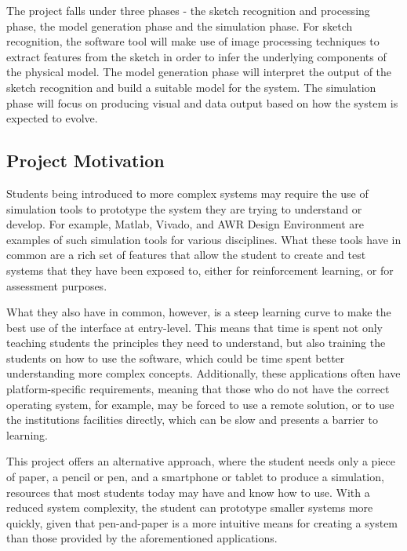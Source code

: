 \documentclass{article}
\begin{document}
The project falls under three phases - the sketch recognition and processing phase, the 
model generation phase and the simulation phase. For sketch recognition, the software tool
will make use of image processing techniques to extract features from the sketch in order to 
infer the underlying components of the physical model. The model generation phase will 
interpret the output of the sketch recognition and build a suitable model for the system.
The simulation phase will focus on producing visual and data output based on how the system
is expected to evolve.

\subsection{Project Motivation}
\label{subsec:Project Motivation}


Students being introduced to more complex systems may require the use of simulation
tools to prototype the system they are trying to understand or develop. For example, Matlab,
Vivado, and AWR Design Environment are examples of such simulation tools for various 
disciplines. What these tools have in common are a rich set of features that allow the student
to create and test systems that they have been exposed to, either for reinforcement learning,
or for assessment purposes. 

What they also have in common, however, is a steep learning curve to make the best use 
of the interface at entry-level. This means that time is spent not only teaching students the 
principles they need to understand, but also training the students on how to use the software, 
which could be time spent better understanding more complex concepts. Additionally, these 
applications often have platform-specific requirements, meaning that those who do not have 
the correct operating system, for example, may be forced to use a remote solution, or to 
use the institutions facilities directly, which can be slow and presents a barrier to learning.

This project offers an alternative approach, where the student needs only a piece of paper,
a pencil or pen, and a smartphone or tablet to produce a simulation, resources that most
students today may have and know how to use. With a reduced system complexity, the student can 
prototype smaller systems more quickly, given that pen-and-paper is a more intuitive means for 
creating a system than those provided by the aforementioned applications.
\end{document}
